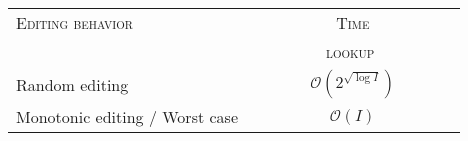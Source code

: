 
\begin{tabularx}{\columnwidth}{@{}Xc@{}}
  \toprule
  \textsc{Editing behavior} & \textsc{Time} \\
  & \ \ \ \ \ \ \ \ \ \textsc{lookup} \ \ \ \ \ \ \ \ \ \\ \midrule
  Random editing & $\mathcal{O}(2^{\sqrt{\log I}})$ \\
  Monotonic editing / Worst case & $\mathcal{O}(I)$ \\ \bottomrule
\end{tabularx}

